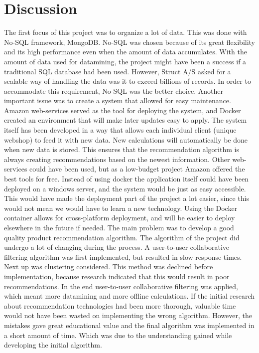 
\chapter{Discussion} %

\label{Chapter7} %


The first focus of this project was to organize a lot of data. This was done with No-SQL framework, MongoDB. No-SQL was chosen because of its great flexibility and its high performance even when the amount of data accumulates. With the amount of data used for datamining, the project might have been a success if a traditional SQL database had been used. However, Struct A/S asked for a scalable way of handling the data was it to exceed billions of records. In order to accommodate this requirement, No-SQL was the better choice.
Another important issue was to create a system that allowed for easy maintenance. Amazon web-services served as the tool for deploying the system, and Docker created an environment that will make later updates easy to apply. The system itself has been developed in a way that allows each individual client (unique webshop) to feed it with new data. New calculations will automatically be done when new data is stored. This ensures that the recommendation algorithm is always creating recommendations based on the newest information. Other web-services could have been used, but as a low-budget project Amazon offered the best tools for free.
Instead of using docker the application itself could have been deployed on a windows server, and the system would be just as easy accessible. This would have made the deployment part of the project a lot easier, since this would not mean we would have to learn a new technology. Using the Docker container allows for cross-platform deployment, and will be easier to deploy elsewhere in the future if needed.
The main problem was to develop a good quality product recommendation algorithm. The algorithm of the project did undergo a lot of changing during the process. A user-to-user collaborative filtering algorithm was first implemented, but resulted in slow response times. Next up was clustering considered. This method was declined before implementation, because research indicated that this would result in poor recommendations. \cite{AmazonRecommendations} In the end user-to-user collaborative filtering was applied, which meant more datamining and more offline calculations. If the initial research about recommendation technologies had been more thorough, valuable time would not have been wasted on implementing the wrong algorithm. However, the mistakes gave great educational value and the final algorithm was implemented in a short amount of time. Which was due to the understanding gained while developing the initial algorithm.